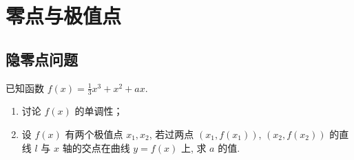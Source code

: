 \section{零点与极值点}
\subsection{隐零点问题}
\begin{example}[2012大纲全国卷]
    已知函数 $f(x) = \frac{1}{3}x^3 + x^2 + ax$.

\begin{enumerate}
    \item 讨论 $f(x)$ 的单调性；
    \item 设 $f(x)$ 有两个极值点 $x_1, x_2$, 若过两点 $(x_1, f(x_1))$, $(x_2, f(x_2))$ 的直线 $l$ 与 $x$ 轴的交点在曲线 $y = f(x)$ 上, 求 $a$ 的值. 
\end{enumerate}
\end{example}

